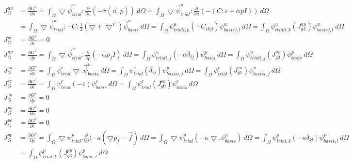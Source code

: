 \begin{align}
J_G^{uu} &= \frac{\partial G^u}{\partial u} = \int_{\Omega} \bigtriangledown \vec{\psi}_{trial}^u : \frac{\partial}{\partial u} (- \sigma(\vec{u},p)) \ d\Omega = \int_{\Omega} \bigtriangledown \vec{\psi}_{trial}^u : \frac{\partial}{\partial u} (-(C:\varepsilon +\alpha p I)) \ d\Omega \\
&= \int_{\Omega} \bigtriangledown \vec{\psi}_{trial}^u : -C: \frac{1}{2} (\bigtriangledown + \bigtriangledown^T) \vec{\psi}_{basis}^u \ d\Omega = \int_{\Omega} \psi_{trial i,k}^u (-C_{ikjl}) \psi_{basis j,l}^u \ d\Omega = \int_{\Omega} \psi_{trial i,k}^u (J_{g3}^{uu}) \psi_{basis j,l}^u \ d\Omega \\
%
J_G^{ue} &= \frac{\partial G^u}{\partial e} = 0 \\
%
J_G^{up} &= \frac{\partial G^u}{\partial p} = \int_{\Omega} \bigtriangledown \vec{\psi}_{trial}^u : \frac{\partial}{\partial p} (-\alpha p_f I) \ d\Omega = \int_{\Omega} \psi_{trial i,j}^u (-\alpha \delta_{ij}) \psi_{basis}^p \ d\Omega = \int_{\Omega} \psi_{trial i,j}^u (J_{g2}^{up}) \psi_{basis}^p \ d\Omega \\
%
J_G^{eu} &= \frac{\partial G^e}{\partial u} = \int_{\Omega} \psi_{trial}^e  \bigtriangledown . \vec{\psi}_{basis}^u \ d\Omega = \int_{\Omega} \psi_{trial}^e (\delta_{ij}) \psi_{basis i,j}^u \ d\Omega = \int_{\Omega} \psi_{trial}^e (J_{g1}^{eu}) \psi_{basis i,j}^u \ d\Omega \\
%
J_G^{ee} &= \frac{\partial G^e}{\partial e} = \int_{\Omega} \psi_{trial}^e (-1) \psi_{basis}^e \ d\Omega = \int_{\Omega} \psi_{trial}^e (J_{g0}^{ee}) \psi_{basis}^e \ d\Omega \\
%
J_G^{ep} &= \frac{\partial G^e}{\partial p} = 0 \\
%
J_G^{pu} &= \frac{\partial G^p}{\partial u} = 0 \\
%
J_G^{pe} &= \frac{\partial G^p}{\partial e} = 0 \\
%
J_G^{pp} &= \frac{\partial G^p}{\partial p} = \int_{\Omega} \bigtriangledown \psi_{trial}^p. \frac{\partial}{\partial p} (-\kappa (\bigtriangledown p_f - \vec{f}) \ d\Omega = \int_{\Omega} \bigtriangledown \psi_{trial}^ p (- \kappa \bigtriangledown . \psi_{basis}^p) \ d\Omega = \int_{\Omega} \psi_{trial,k}^p (- \kappa \delta_{kl}) \psi_{basis,l}^p \ d\Omega \\
&= \int_{\Omega} \psi_{trial,k}^p (J_{g3}^{pp}) \psi_{basis,l}^p \ d\Omega 
\end{align} \\

